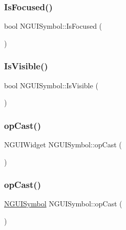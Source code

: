 \subsubsection{\texorpdfstring{Is\+Focused()}{IsFocused()}}
{\footnotesize\ttfamily bool N\+G\+U\+I\+Symbol\+::\+Is\+Focused (\begin{DoxyParamCaption}{ }\end{DoxyParamCaption})}

\hypertarget{class_n_g_u_i_symbol_aadc54657a7852d023d514d0ebb5bd10d}{}\label{class_n_g_u_i_symbol_aadc54657a7852d023d514d0ebb5bd10d} 
\subsubsection{\texorpdfstring{Is\+Visible()}{IsVisible()}}
{\footnotesize\ttfamily bool N\+G\+U\+I\+Symbol\+::\+Is\+Visible (\begin{DoxyParamCaption}{ }\end{DoxyParamCaption})}

\hypertarget{class_n_g_u_i_symbol_aef202b531f724f6f4c57a79903b6cc84}{}\label{class_n_g_u_i_symbol_aef202b531f724f6f4c57a79903b6cc84} 
\subsubsection{\texorpdfstring{op\+Cast()}{opCast()}\hspace{0.1cm}{\footnotesize\ttfamily [1/2]}}
{\footnotesize\ttfamily N\+G\+U\+I\+Widget N\+G\+U\+I\+Symbol\+::op\+Cast (\begin{DoxyParamCaption}{ }\end{DoxyParamCaption})}

\hypertarget{class_n_g_u_i_symbol_a46b6d3d5012610e6b77414901fde2f0c}{}\label{class_n_g_u_i_symbol_a46b6d3d5012610e6b77414901fde2f0c} 
\subsubsection{\texorpdfstring{op\+Cast()}{opCast()}\hspace{0.1cm}{\footnotesize\ttfamily [2/2]}}
{\footnotesize\ttfamily \hyperlink{class_n_g_u_i_symbol}{N\+G\+U\+I\+Symbol} N\+G\+U\+I\+Symbol\+::op\+Cast (\begin{DoxyParamCaption}{ }\end{DoxyParamCaption})}

